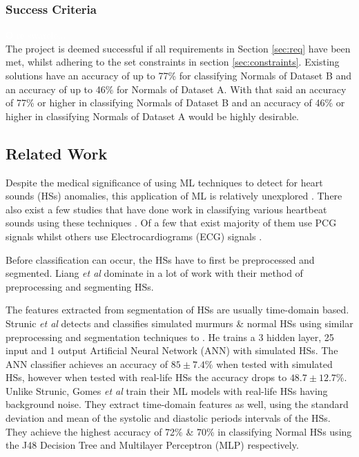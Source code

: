 \documentclass[10pt,twocolumn]{witseiepaper}
\begin{document}
\subsubsection{Success Criteria}
\textcolor{white}{O re swarele...}\\
The project is deemed successful if all requirements in Section \ref{sec:req} have been met, whilst adhering to the set constraints in section \ref{sec:constraints}. Existing solutions
have an accuracy of up to 77\% for classifying Normals of Dataset B and an accuracy of up to 46\%
for Normals of Dataset A. With that said an accuracy of 77\% or higher in classifying Normals of Dataset B and
an accuracy of 46\% or higher in classifying Normals of Dataset A would be highly desirable.

\subsection{Related Work}
\label{sec:lit}
Despite the medical significance of using ML techniques to detect for heart sounds (HSs) anomalies, this application of ML is relatively unexplored \cite{bentley}. There also exist a few studies that have done work in classifying various heartbeat sounds using these techniques \cite{26}. Of a few that exist majority of them use PCG signals \cite{22,3} whilst others use Electrocardiograms (ECG) signals \cite{5}. 

Before classification can occur, the HSs have to first be preprocessed and segmented. Liang \textit{et al} \cite{6} dominate in a lot of work \cite{22,15} with their method of preprocessing and segmenting HSs.  

The features extracted from segmentation of HSs are usually time-domain based. Strunic \textit{et al} \cite{3} detects and classifies simulated murmurs \& normal HSs using similar preprocessing and segmentation techniques to \cite{6}. He trains a 3 hidden layer, 25 input and 1 output Artificial Neural Network (ANN) with simulated HSs. The ANN classifier achieves an accuracy of $85\pm7.4\%$ when tested with simulated HSs, however when tested with real-life HSs the accuracy drops to $48.7\pm12.7\%$. Unlike Strunic, Gomes \textit{et al} \cite{gomes2012classifying} train their ML models with real-life HSs having background noise. They extract time-domain features as well, using the standard deviation and mean of the systolic and diastolic periods intervals of the HSs. They achieve the highest accuracy of 72\% \& 70\% in classifying Normal HSs using the J48 Decision Tree and Multilayer Perceptron (MLP) respectively.
\end{document}
